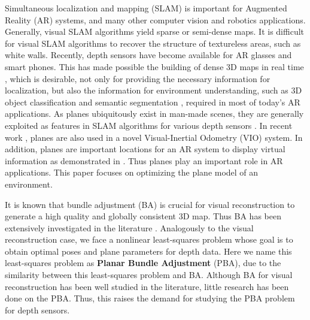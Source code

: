 \documentclass{vgtc}                          %
\begin{document}
Simultaneous localization and mapping (SLAM)   is important for  Augmented Reality (AR) systems, and many other computer vision and robotics applications. Generally, visual SLAM algorithms \cite{Klein2009ParallelTA,schops2014semi,liu2016robust,mur2017orb,liu2018ice} yield  sparse or semi-dense maps. It is difficult for visual SLAM algorithms to recover the structure of textureless  areas, such as white walls. Recently, depth sensors have become available for AR glasses and smart phones. This has made possible the building of  dense 3D maps in real time \cite{salas2014dense,kaess2015simultaneous,hsiao2017keyframe,hsiao2018dense,huang2019optimization}, which is desirable, not only for providing the necessary information for localization, but also the   information for environment understanding,  such as 3D  object classification and semantic segmentation \cite{qi2017pointnet},  required in most of today's AR applications. As planes    ubiquitously exist in  man-made scenes,  they are generally exploited as features in SLAM algorithms for  various depth sensors  \cite{pathak2010fast,lee2012indoor,trevor2012planar,salas2014dense,kaess2015simultaneous,yang2016pop,hsiao2017keyframe,zhang2017low,hsiao2018dense,kim2018linear,huang2019optimization,yang2019monocular}. In recent work \cite{li2019robust}, planes are also used in a novel Visual-Inertial Odometry (VIO) system. In addition,  planes  are important locations for an AR system to display virtual information as demonstrated in \cite{salas2014dense}. Thus planes play an  important role in AR applications. 
This paper focuses on optimizing the plane model of an environment.

It is known that bundle adjustment (BA)  is  crucial  for visual reconstruction  to generate a high quality and globally consistent 3D map. Thus BA has been extensively investigated in the literature \cite{triggs1999bundle,hartley2003multiple,lourakis2009sba,agarwal2010bundle,grisetti2010tutorial,wu2011multicore,kaess2012isam2,zach2014robust,schonberger2016structure,zhang2017distributed,liu2018ice}.
Analogously to the visual reconstruction case, we face a nonlinear least-squares problem whose goal is to obtain optimal  poses and plane parameters for depth data.   %
Here we name this least-squares problem as \textbf{Planar Bundle Adjustment} (PBA), due to the similarity between  this  least-squares problem and BA.  Although  BA for  visual  reconstruction has been well studied in the literature, little research has been done on the  PBA.  Thus, this raises the demand for  studying  the  PBA problem for depth sensors.
\end{document}
